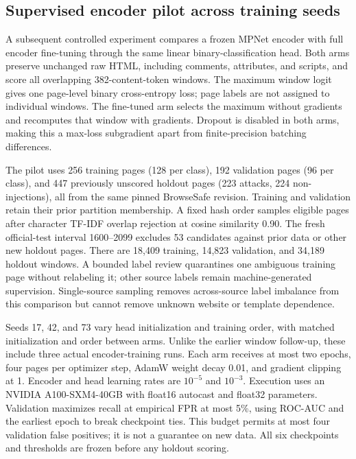 \documentclass[11pt, a4paper]{article}
\begin{document}
\subsection{Supervised encoder pilot across training seeds}
\label{sec:supervised-pilot}
A subsequent controlled experiment compares a frozen MPNet encoder with
full encoder fine-tuning through the same linear binary-classification head.
Both arms preserve unchanged raw HTML, including comments, attributes,
and scripts, and score all overlapping 382-content-token windows. The
maximum window logit gives one page-level binary cross-entropy loss;
page labels are not assigned to individual windows. The fine-tuned arm
selects the maximum without gradients and recomputes that window with
gradients. Dropout is disabled in both arms, making this a max-loss
subgradient apart from finite-precision batching differences.

The pilot uses 256 training pages (128 per class), 192 validation pages
(96 per class), and 447 previously unscored holdout pages (223 attacks,
224 non-injections), all from the same pinned BrowseSafe revision.
Training and validation retain their prior partition membership. A fixed
hash order samples eligible pages after character TF-IDF overlap rejection
at cosine similarity 0.90. The fresh official-test interval 1600--2099
excludes 53 candidates against prior data or other new holdout pages.
There are 18,409 training, 14,823 validation, and 34,189 holdout windows.
A bounded label review quarantines one ambiguous training page without
relabeling it; other source labels remain machine-generated supervision.
Single-source sampling removes across-source label imbalance from this
comparison but cannot remove unknown website or template dependence.

Seeds 17, 42, and 73 vary head initialization and training order, with
matched initialization and order between arms. Unlike the earlier window
follow-up, these include three actual encoder-training runs. Each arm
receives at most two epochs, four pages per optimizer step, AdamW weight
decay 0.01, and gradient clipping at 1. Encoder and head learning rates are
$10^{-5}$ and $10^{-3}$. Execution uses an NVIDIA A100-SXM4-40GB with
float16 autocast and float32 parameters. Validation maximizes recall at
empirical FPR at most 5\%, using ROC-AUC and the earliest epoch to break
checkpoint ties. This budget permits at most four validation false
positives; it is not a guarantee on new data. All six checkpoints and
thresholds are frozen before any holdout scoring.
\end{document}
